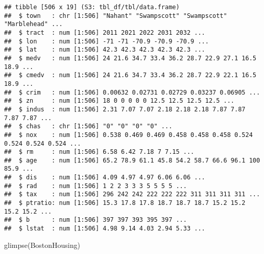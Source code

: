 \documentclass[
]{book}
\newenvironment{Shaded}{\begin{snugshade}}{\end{snugshade}}
\newcommand{\FunctionTok}[1]{\textcolor[rgb]{0.00,0.00,0.00}{#1}}
\newcommand{\NormalTok}[1]{#1}
\begin{document}
\begin{verbatim}
## tibble [506 x 19] (S3: tbl_df/tbl/data.frame)
##  $ town   : chr [1:506] "Nahant" "Swampscott" "Swampscott" "Marblehead" ...
##  $ tract  : num [1:506] 2011 2021 2022 2031 2032 ...
##  $ lon    : num [1:506] -71 -71 -70.9 -70.9 -70.9 ...
##  $ lat    : num [1:506] 42.3 42.3 42.3 42.3 42.3 ...
##  $ medv   : num [1:506] 24 21.6 34.7 33.4 36.2 28.7 22.9 27.1 16.5 18.9 ...
##  $ cmedv  : num [1:506] 24 21.6 34.7 33.4 36.2 28.7 22.9 22.1 16.5 18.9 ...
##  $ crim   : num [1:506] 0.00632 0.02731 0.02729 0.03237 0.06905 ...
##  $ zn     : num [1:506] 18 0 0 0 0 0 12.5 12.5 12.5 12.5 ...
##  $ indus  : num [1:506] 2.31 7.07 7.07 2.18 2.18 2.18 7.87 7.87 7.87 7.87 ...
##  $ chas   : chr [1:506] "0" "0" "0" "0" ...
##  $ nox    : num [1:506] 0.538 0.469 0.469 0.458 0.458 0.458 0.524 0.524 0.524 0.524 ...
##  $ rm     : num [1:506] 6.58 6.42 7.18 7 7.15 ...
##  $ age    : num [1:506] 65.2 78.9 61.1 45.8 54.2 58.7 66.6 96.1 100 85.9 ...
##  $ dis    : num [1:506] 4.09 4.97 4.97 6.06 6.06 ...
##  $ rad    : num [1:506] 1 2 2 3 3 3 5 5 5 5 ...
##  $ tax    : num [1:506] 296 242 242 222 222 222 311 311 311 311 ...
##  $ ptratio: num [1:506] 15.3 17.8 17.8 18.7 18.7 18.7 15.2 15.2 15.2 15.2 ...
##  $ b      : num [1:506] 397 397 393 395 397 ...
##  $ lstat  : num [1:506] 4.98 9.14 4.03 2.94 5.33 ...
\end{verbatim}

\begin{Shaded}
\begin{Highlighting}[]
\FunctionTok{glimpse}\NormalTok{(BostonHousing)}
\end{Highlighting}
\end{Shaded}
\end{document}
